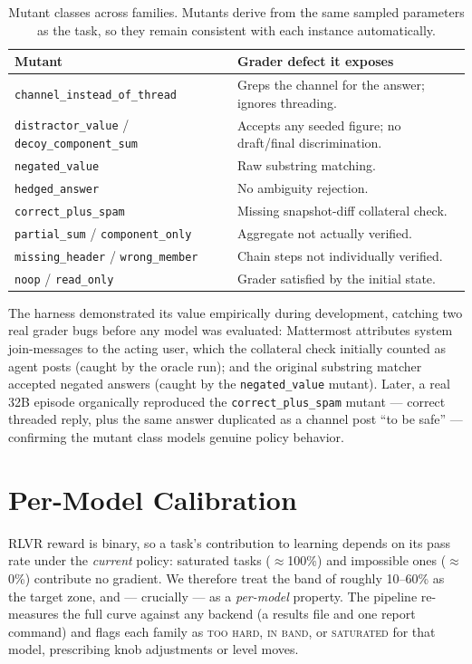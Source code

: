 \documentclass[10pt]{article}
\begin{document}
\begin{table}[t]
\centering\small
\begin{tabular}{@{}lp{8.8cm}@{}}
\toprule
Mutant & Grader defect it exposes \\
\midrule
\texttt{channel\_instead\_of\_thread} & Greps the channel for the answer; ignores threading. \\
\texttt{distractor\_value} / \texttt{decoy\_component\_sum} & Accepts any seeded figure; no draft/final discrimination. \\
\texttt{negated\_value} & Raw substring matching. \\
\texttt{hedged\_answer} & No ambiguity rejection. \\
\texttt{correct\_plus\_spam} & Missing snapshot-diff collateral check. \\
\texttt{partial\_sum} / \texttt{component\_only} & Aggregate not actually verified. \\
\texttt{missing\_header} / \texttt{wrong\_member} & Chain steps not individually verified. \\
\texttt{noop} / \texttt{read\_only} & Grader satisfied by the initial state. \\
\bottomrule
\end{tabular}
\caption{Mutant classes across families. Mutants derive from the same sampled parameters as the task, so they remain consistent with each instance automatically.}
\label{tab:mutants}
\end{table}

The harness demonstrated its value empirically during development, catching two real grader bugs before any model was evaluated: Mattermost attributes system join-messages to the acting user, which the collateral check initially counted as agent posts (caught by the oracle run); and the original substring matcher accepted negated answers (caught by the \texttt{negated\_value} mutant). Later, a real 32B episode organically reproduced the \texttt{correct\_plus\_spam} mutant --- correct threaded reply, plus the same answer duplicated as a channel post ``to be safe'' --- confirming the mutant class models genuine policy behavior.

\section{Per-Model Calibration}\label{sec:calibration}

RLVR reward is binary, so a task's contribution to learning depends on its pass rate under the \emph{current} policy: saturated tasks ($\approx$100\%) and impossible ones ($\approx$0\%) contribute no gradient. We therefore treat the band of roughly 10--60\% as the target zone, and --- crucially --- as a \emph{per-model} property. The pipeline re-measures the full curve against any backend (a results file and one report command) and flags each family as \textsc{too hard}, \textsc{in band}, or \textsc{saturated} for that model, prescribing knob adjustments or level moves.
\end{document}
